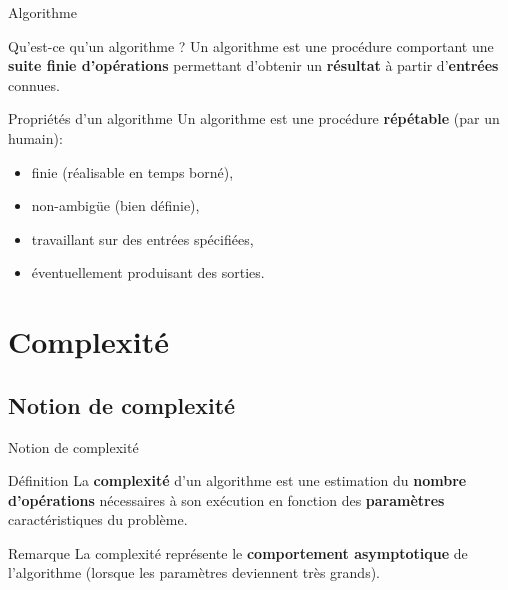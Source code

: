\begin{frame}{Algorithme}

\begin{block}{Qu'est-ce qu'un algorithme ?}
Un algorithme est une procédure comportant une \textbf{suite finie d'opérations} permettant d'obtenir un \textbf{résultat} à partir d'\textbf{entrées} connues.
\end{block}
\pause
\begin{block}{Propriétés d'un algorithme}
Un algorithme est une procédure \textbf{répétable} (par un humain):
    \begin{itemize}
        \item<+> finie (réalisable en temps borné),
        \item<+> non-ambigüe (bien définie),
        \item<+> travaillant sur des entrées spécifiées,
        \item<+> éventuellement produisant des sorties.
    \end{itemize}
\end{block}

\end{frame}

\section{Complexité}

\subsection{Notion de complexité}

\begin{frame}{Notion de complexité}
    \begin{block}{Définition}
        La \textbf{complexité} d'un algorithme est une estimation du \textbf{nombre d'opérations} nécessaires à son exécution en fonction des \textbf{paramètres} caractéristiques du problème.
    \end{block}
    \begin{exampleblock}{Remarque}
        La complexité représente le \textbf{comportement asymptotique} de l'algorithme (lorsque les paramètres deviennent très grands).
    \end{exampleblock}
\end{frame}

